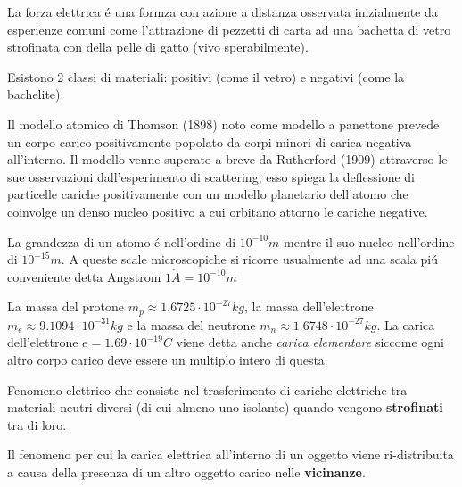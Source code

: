 





\begin{multicols}{3}
  La forza elettrica \'e una formza con azione a distanza osservata inizialmente
  da esperienze comuni come l'attrazione di pezzetti di carta ad una bachetta di
  vetro strofinata con della pelle di gatto (vivo sperabilmente).

  Esistono 2 classi di materiali: positivi (come il vetro) e negativi
  (come la bachelite).

  Il modello atomico di Thomson (1898) noto come modello a panettone prevede un
  corpo carico positivamente popolato da corpi minori di carica negativa
  all'interno. Il modello venne superato a breve da Rutherford (1909)
  attraverso le sue osservazioni dall'esperimento di scattering; esso spiega
  la deflessione di particelle cariche positivamente con un modello planetario
  dell'atomo che coinvolge un denso nucleo positivo a cui orbitano attorno le
  cariche negative.

  La grandezza di un atomo \'e nell'ordine di $10^{-10}m$ mentre il suo nucleo
  nell'ordine di $10^{-15}m$. A queste scale microscopiche si ricorre usualmente
  ad una scala pi\'u conveniente detta Angstrom $1\mathring{A} = 10^{-10}m$

  La massa del protone $m_p\approx 1.6725\cdot 10^{-27} kg$,
  la massa dell'elettrone $m_e \approx 9.1094 \cdot 10^{-31} kg$ e
  la massa del neutrone $m_n\approx 1.6748\cdot 10^{-27} kg$.
  La carica dell'elettrone  $e = 1.69 \cdot 10^{-19} C$ viene detta anche
  \textit{carica elementare} siccome ogni altro corpo carico deve essere un
  multiplo intero di questa.
  

  Fenomeno elettrico che consiste nel trasferimento di cariche elettriche tra
  materiali neutri diversi (di cui almeno uno isolante) quando vengono
  \textbf{strofinati} tra di loro.

  Il fenomeno per cui la carica elettrica all'interno di un oggetto viene
  ri-distribuita a causa della presenza di un altro oggetto carico nelle
  \textbf{vicinanze}.


\end{multicols}
